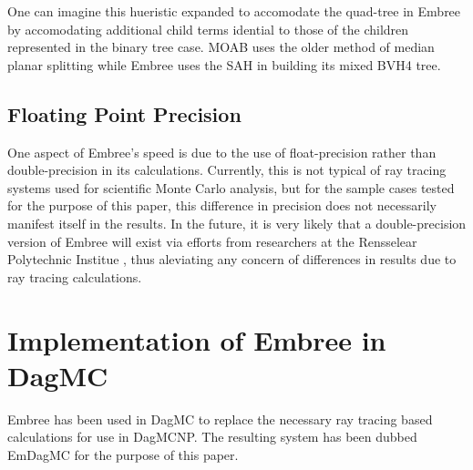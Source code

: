 \documentclass{anstrans}
\begin{document}


One can imagine this hueristic expanded to accomodate the quad-tree in Embree by accomodating additional child terms idential to those of the children represented in the binary tree case. MOAB uses the older method of median planar splitting while Embree uses the SAH in building its mixed BVH4 tree. 

\subsection{Floating Point Precision}

One aspect of Embree's speed is due to the use of float-precision rather than double-precision in its calculations. Currently, this is not typical of ray tracing systems used for scientific Monte Carlo analysis, but for the sample cases tested for the purpose of this paper, this difference in precision does not necessarily manifest itself in the results. In the future, it is very likely that a double-precision version of Embree will exist via efforts from researchers at the Rensselear Polytechnic Institue \cite{gpu_mic_ray_tracing_rpi}, thus aleviating any concern of differences in results due to ray tracing calculations.

\section{Implementation of Embree in DagMC}

Embree has been used in DagMC to replace the necessary ray tracing based calculations for use in DagMCNP. The resulting system has been dubbed EmDagMC for the purpose of this paper. 
\end{document}
